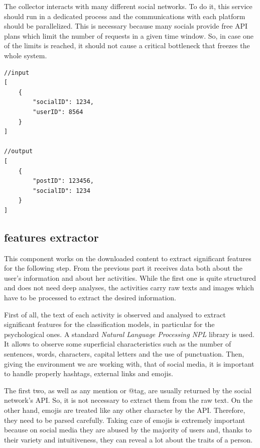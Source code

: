 The collector interacts with many different social networks. To do it, this service should run in a dedicated process and the communications with each platform should be parallelized.
This is necessary because many socials provide free API plans which limit the number of requests in a given time window. So, in case one of the limits is reached, it should not cause a critical bottleneck that freezes the whole system.

\begin{multicols}{2}
\begin{verbatim}
//input
[
    {
        "socialID": 1234,
        "userID": 8564
    }
]

//output
[
    {
        "postID": 123456,
        "socialID": 1234
    }
]
\end{verbatim}
\end{multicols}

\subsection{features extractor}
This component works on the downloaded content to extract significant features for the following step.
From the previous part it receives data both about the user's information and about her activities. While the first one is quite structured and does not need deep analyses, the activities carry raw texts and images which have to be processed to extract the desired information.

First of all, the text of each activity is observed and analysed to extract significant features for the classification models, in particular for the psychological ones.
A standard \emph{Natural Language Processing NPL} library is used. It allows to observe some superficial characteristics such as the number of sentences, words, characters, capital letters and the use of punctuation.
Then, giving the environment we are working with, that of social media, it is important to handle properly hashtags, external links and emojis.

The first two, as well as any mention or @tag, are usually returned by the social network's API. So, it is not necessary to extract them from the raw text.
On the other hand, emojis are treated like any other character by the API. Therefore, they need to be parsed carefully.
Taking care of emojis is extremely important because on social media they are abused by the majority of users and, thanks to their variety and intuitiveness, they can reveal a lot about the traits of a person.

